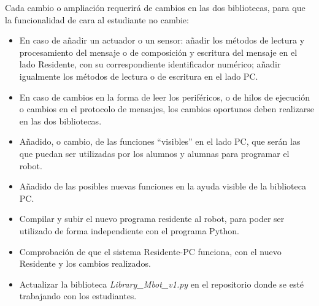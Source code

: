 Cada cambio o ampliación requerirá de cambios en las dos bibliotecas, para que la funcionalidad de cara al estudiante no cambie:
\begin{itemize}
	\item En caso de añadir un actuador o un sensor: añadir los métodos de lectura y procesamiento del mensaje o de composición y escritura del mensaje  en el lado Residente, con su correspondiente identificador numérico; añadir igualmente los métodos de lectura o de escritura en el lado PC.
	\item En caso de cambios en la forma de leer los periféricos, o de hilos de ejecución o cambios en el protocolo de mensajes, los cambios oportunos deben realizarse en las dos bibliotecas.
	\item Añadido, o cambio, de las funciones ``visibles'' en el lado PC, que serán las que puedan ser utilizadas por los alumnos y alumnas para programar el robot. 
	\item Añadido de las posibles nuevas funciones en la ayuda visible de la biblioteca PC.
	\item Compilar y subir el nuevo programa residente al robot, para poder ser utilizado de forma independiente con el programa Python.
	\item Comprobación de que el sistema Residente-PC funciona, con el nuevo Residente y los cambios realizados. 
	\item Actualizar la biblioteca\textit{ Library\_Mbot\_v1.py} en el repositorio donde se esté trabajando con los estudiantes. 
\end{itemize}